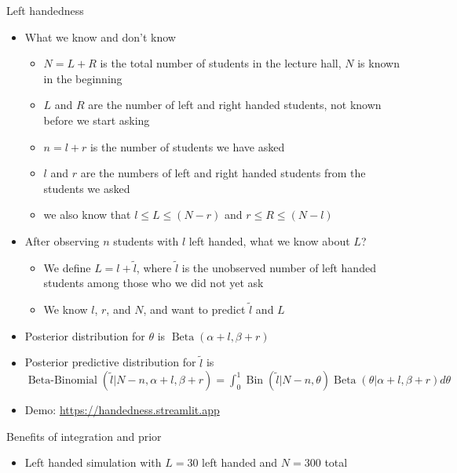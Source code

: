 \documentclass[english,t]{beamer}
\DeclareMathOperator{\Bin}{Bin}
\DeclareMathOperator{\Beta}{Beta}
\DeclareMathOperator{\BetaBinomial}{Beta-Binomial}
\begin{document}
\begin{frame}{Left handedness}

  \vspace{-0.5\baselineskip}
  \begin{itemize}
  \item What we know and don't know
    \begin{itemize}
    \item $N=L+R$ is the total number of students in the lecture hall,
      $N$ is known in the beginning
    \item $L$ and $R$ are the number of left and right handed students, not known before we start asking
    \item $n=l+r$ is the number of students we have asked
    \item $l$ and $r$ are the numbers of left and right handed students from the students we asked
    \item we also know that $l \leq L \leq (N-r)$ and $r \leq R \leq (N-l)$
    \end{itemize}
  \item After observing $n$ students with $l$ left handed, what we
    know about $L$?
    \begin{itemize}
    \item We define $L=l+\tilde{l}$, where $\tilde{l}$ is the
      unobserved number of left handed students among those who we did
      not yet ask
    \item We know $l$, $r$, and $N$, and want to predict $\tilde{l}$ and $L$
    \end{itemize}
  \item {\color{blue} Posterior} distribution for
    $\theta$ is $\Beta(\alpha+l, \beta+r)$
  \item {\color{red} Posterior predictive} distribution for
    $\displaystyle\tilde{l}$ is\\
    $\BetaBinomial(\tilde{l} | N-n, \alpha+l, \beta+r)=\int_0^1\Bin(\tilde{l} | N-n, \theta)\Beta(\theta | \alpha+l, \beta+r)d\theta$
  \item {\small Demo: \url{https://handedness.streamlit.app}}
  \end{itemize}
  
\end{frame}

\begin{frame}{Benefits of integration and prior}

  \begin{itemize}
  \item Left handed simulation with $L=30$ left handed and $N=300$ total
  \end{itemize}
  

\end{frame}
\end{document}
